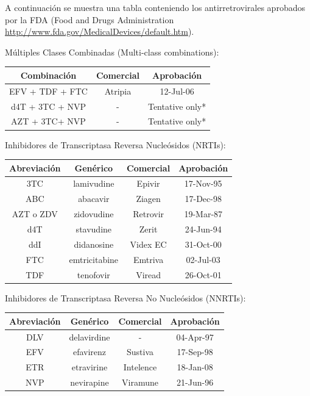   A continuaci\'on se muestra una tabla conteniendo los antirretrovirales aprobados por la FDA (Food and Drugs Administration
  \url{http://www.fda.gov/MedicalDevices/default.htm}).


  M\'ultiples Clases Combinadas (Multi-class combinations):
  \begin{center}
    \begin{tabular}{|c|c|c|}
      \hline Combinaci\'on & Comercial & Aprobaci\'on \\ 
      \hline EFV + TDF + FTC & Atripia & 12-Jul-06 \\ 
      \hline d4T + 3TC + NVP & - & Tentative only* \\ 
      \hline AZT + 3TC+ NVP & - & Tentative only* \\ 
      \hline 
    \end{tabular}
  \end{center}

  Inhibidores de Transcriptasa Reversa Nucle\'osidos (NRTIs):

  \begin{center}
    \begin{tabular}{|c|c|c|c|}
      \hline Abreviaci\'on & Gen\'erico & Comercial & Aprobaci\'on \\ 
      \hline 3TC & lamivudine & Epivir & 17-Nov-95 \\ 
      \hline ABC & abacavir   & Ziagen & 17-Dec-98  \\ 
      \hline AZT o ZDV & zidovudine & Retrovir & 19-Mar-87 \\ 
      \hline d4T & stavudine & Zerit & 24-Jun-94  \\ 
      \hline ddI & didanosine & Videx EC & 31-Oct-00  \\ 
      \hline FTC & emtricitabine & Emtriva & 02-Jul-03 \\ 
      \hline TDF & tenofovir & Viread & 26-Oct-01  \\ 
      \hline 
    \end{tabular}
  \end{center}

  Inhibidores de Transcriptasa Reversa No Nucle\'osidos (NNRTIs):

  \begin{center}
    \begin{tabular}{|c|c|c|c|}
      \hline Abreviaci\'on & Gen\'erico & Comercial & Aprobaci\'on \\ 
      \hline DLV & delavirdine & - & 04-Apr-97 \\ 
      \hline EFV & efavirenz   & Sustiva & 17-Sep-98 \\ 
      \hline ETR & etravirine & Intelence & 18-Jan-08 \\ 
      \hline NVP & nevirapine & Viramune & 21-Jun-96 \\ 
      \hline 
    \end{tabular}
  \end{center}

